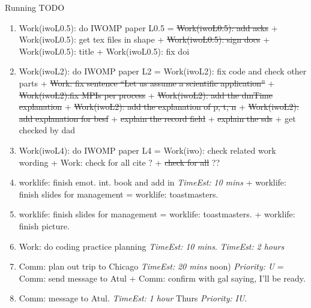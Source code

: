 \documentclass[serif, mathserif, final]{beamer}
\newcommand{\doneTaskNoItem}[1]{\sout{#1}}
\newcommand{\te}[1]{\textit{TimeEst:} \textit{#1}}
\newcommand{\prio}[1]{\textit{Priority:} \textit{#1}}
\newcommand{\dl}[1]{#1}
\begin{document}
\begin{frame}{}
\begin{columns}
\begin{column}{0.50\linewidth}
\begin{block}{Running TODO}
\begin{enumerate}

       


        \item \small Work(iwoL0.5): do IWOMP paper L0.5 =
          \doneTaskNoItem{Work(iwoL0.5): add acks} + Work(iwoL0.5):
          get tex files in shape + \doneTaskNoItem{Work(iwoL0.5): sign
            docs} + Work(iwoL0.5): title + Work(iwoL0.5): fix doi 
        \item \small Work(iwoL2): do IWOMP paper L2 = Work(iwoL2): fix
          code and check other parts + \doneTaskNoItem{Work: fix
            sentence ``Let us assume a scientific application''} +
          \doneTaskNoItem{Work(iwoL2):fix MPIs per process} +
          \doneTaskNoItem{Work(iwoL2): add the dmTime explanation} + 
          \doneTaskNoItem{Work(iwoL2): add the explanation of p, t, n}
          + \doneTaskNoItem{Work(iwoL2): add explanation for besf} 
          + \doneTaskNoItem{explain the record field} 
          + \doneTaskNoItem{explain the sds} 
          + get checked by dad 
       

        \item \small Work(iwoL4): do IWOMP paper L4 = Work(iwo): check
          related work wording + Work: check for all cite ?
          + \doneTaskNoItem{check for all} ?? 

        \item \small worklife: finish emot. int. book and add in
          \te{10 mins} +  worklife: finish slides for management =
          worklife: toastmasters. 
        \item \small worklife: finish slides for management =
          worklife: toastmasters.  + worklife: finish picture. 

        \item \small Work: do coding practice planning \te{10
          mins}. \te{2 hours} 
          
        \item \small Comm: plan out trip to Chicago \te{20 mins} \dl{noon)
          \prio{U} = Comm: send message to Atul + Comm: confirm with gal
          saying, I'll be ready.
          
        \item \small Comm: message to Atul. \te{1 hour}  \dl{Thurs}
          \prio{IU}. 
          
}
\end{enumerate}
\end{block}
\end{column}
\end{columns}
\end{frame}
\end{document}
